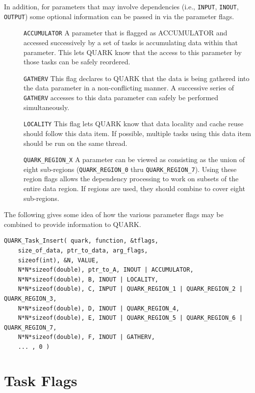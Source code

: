 \documentclass[11pt,letterpaper]{report}
\begin{document}
In addition, for parameters that may involve dependencies (i.e.,
\verb|INPUT|, \verb|INOUT|, \verb|OUTPUT|) some optional information
can be passed in via the parameter flags.
\begin{description}
\item[]\verb|ACCUMULATOR| A parameter that is flagged as ACCUMULATOR
  and accessed successively by a set of tasks is accumulating data
  within that parameter.  This lets QUARK know that the access to this
  parameter by those tasks can be safely reordered.
\item[]\verb|GATHERV| This flag declares to QUARK that the data is
  being gathered into the data parameter in a non-conflicting manner.
  A successive series of \verb|GATHERV| accesses to this data parameter
  can safely be performed simultaneously.
\item[]\verb|LOCALITY|  This flag lets QUARK know that data locality
  and cache reuse should follow this data item.  If possible, multiple
  tasks using this data item should be run on the same thread.
\item[]\verb|QUARK_REGION_X| A parameter can be viewed as consisting
  as the union of eight sub-regions (\verb|QUARK_REGION_0| thru
  \verb|QUARK_REGION_7|).  Using these region flags allows the
  dependency processing to work on subsets of the entire data region.
  If regions are used, they should combine to cover eight sub-regions.
\end{description}
\pagebreak[3]
The following gives some idea of how the various parameter flags may
be combined to provide information to QUARK.
\pagebreak[3]
\begin{samepage}
\begin{lstlisting}
QUARK_Task_Insert( quark, function, &tflags,
    size_of_data, ptr_to_data, arg_flags,
    sizeof(int), &N, VALUE,
    N*N*sizeof(double), ptr_to_A, INOUT | ACCUMULATOR,
    N*N*sizeof(double), B, INOUT | LOCALITY,
    N*N*sizeof(double), C, INPUT | QUARK_REGION_1 | QUARK_REGION_2 | QUARK_REGION_3,
    N*N*sizeof(double), D, INOUT | QUARK_REGION_4,
    N*N*sizeof(double), E, INOUT | QUARK_REGION_5 | QUARK_REGION_6 | QUARK_REGION_7,
    N*N*sizeof(double), F, INOUT | GATHERV,
    ... , 0 )
\end{lstlisting}
\end{samepage}
\pagebreak[3]

\section{Task Flags}
\end{document}

